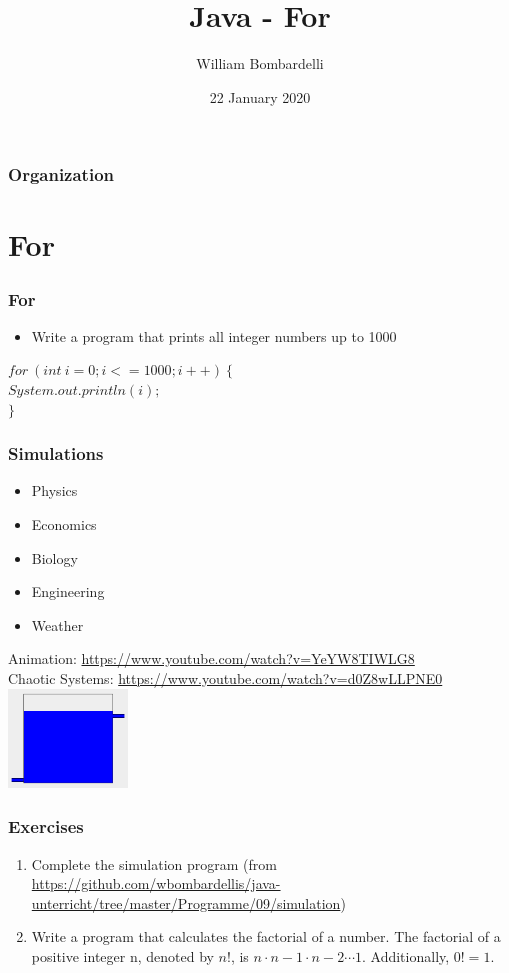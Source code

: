 \documentclass{beamer}
\title[Java]{Java - For}
\author[W. Bombardelli]{William Bombardelli}
\institute[Schweizerschule Mexiko]
{
	\vskip 12pt
	Schweizerschule Mexiko, Ciudad de México, Mexico \\
	\texttt{\url{https://github.com/wbombardellis/java-unterricht}}
}
\date{22 January 2020}
\newcommand{\cindent}{\hskip20pt}
\begin{document}
	\begin{frame}
		\titlepage
	\end{frame}
	
	\begin{frame}
		\frametitle{Organization}
		\tableofcontents
	\end{frame}

	\section{For}
	\begin{frame}
		\frametitle{For}
		\begin{itemize}
			\item Write a program that prints all integer numbers up to 1000
		\end{itemize}
		\pause
		$for\ (int\ i = 0; i <= 1000; i++)\ \{$\\
			\cindent $System.out.println(i);$\\
		$\}$\\
	\end{frame}

	\begin{frame}
		\frametitle{Simulations}
		\begin{itemize}
			\item Physics
			\item Economics
			\item Biology
			\item Engineering
			\item Weather
		\end{itemize}
		\pause
		Animation: \url{https://www.youtube.com/watch?v=YeYW8TIWLG8}\\
		Chaotic Systems: \url{https://www.youtube.com/watch?v=d0Z8wLLPNE0}\\
		\pause
		\centering
		\includegraphics[width=90pt]{tank.png}
	\end{frame}

	\begin{frame}
		\frametitle{Exercises}
		\begin{enumerate}
			\item Complete the simulation program (from \url{https://github.com/wbombardellis/java-unterricht/tree/master/Programme/09/simulation})
			\pause
			\item Write a program that calculates the factorial of a number. The factorial of a positive integer n, denoted by $n!$, is $n \cdot n-1 \cdot n-2 \cdots 1$. Additionally, $0! = 1$.
		\end{enumerate}
	\end{frame}
\end{document}
